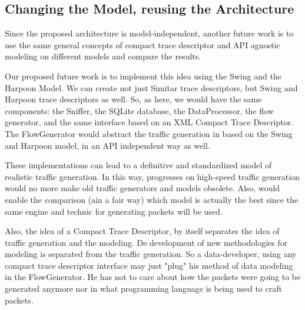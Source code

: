 \subsection{Changing the Model, reusing the Architecture}

Since the proposed architecture is model-independent, another future work is to use the same general concepts of compact trace descriptor and API agnostic modeling on different models and compare the results.

Our proposed future work is to implement this idea using the Swing\cite{swing-paper} and the Harpoon Model\cite{harpoon-paper}.  We can create not just Simitar trace descriptors, but Swing and Harpoon trace descriptors as well. So, as here, we would have the same components: the Sniffer, the SQLite database, the DataProcessor, the flow generator, and the same interface based on an XML Compact Trace Descriptor. The FlowGenerator would abstract the traffic generation in based on the Swing and Harpoon model, in an API independent way as well. 

These implementations can lead to a definitive and standardized model of realistic traffic generation. In this way, progresses on high-speed traffic generation would no more make old traffic generators and models obsolete. Also, would enable the comparison (ain a fair way) which model is actually the best since the same engine and technic for generating packets will be used.

Also, the idea of a Compact Trace Descriptor, by itself separates the idea of traffic generation and the modeling. De development of new methodologies for modeling is  separated from the traffic generation. So a data-developer, using any compact trace descriptor interface may just "plug" his method of data modeling in the FlowGenerator. He has not to care about how the packets were going to be generated anymore nor in what programming language is being used to craft packets.






